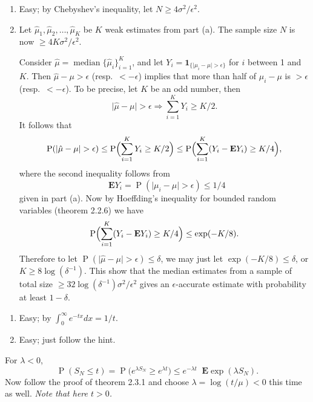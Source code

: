 \documentclass[11pt]{article}
\newcommand{\abs}[1]{\lvert #1 \rvert}
\renewcommand{\implies}{\Rightarrow}
\renewcommand{\Pr}{\operatorname{P}}
\newcommand{\E}{\mathop{}\!\mathbf{E}}
\newcommand{\I}[1]{\mathbf{1}_{\{#1\}}}
\theoremstyle{plain}
\theoremstyle{definition}
\theoremstyle{remark}
\theoremstyle{definition}
\newenvironment{mansol}[1]{%
  \renewcommand\themansolinner{#1}%
  \mansolinner
}{\endmansolinner}
\begin{document}
\begin{mansol}{2.2.9}
\begin{enumerate}[label=(\alph*)]
    \item Easy; by Chebyshev's inequality, let $N \geq 4 \sigma^2 / \epsilon^2$.
    \item Let $\hat{\mu}_1,\hat{\mu}_2,\ldots,\hat{\mu}_K$ be $K$ weak estimates from part (a). The sample size $N$ is now $\geq 4K \sigma^2/\epsilon^2$.

    Consider $\hat \mu = \operatorname{median}\{\hat \mu_i\}_{i=1}^K$, and let $Y_i = \I{\abs{\mu_i - \mu} > \epsilon}$ for $i$ between 1 and $K$. Then $\hat \mu - \mu > \epsilon$ (resp.\ $< -\epsilon$) implies that more than half of $\mu_i - \mu$ is $> \epsilon$ (resp.\ $< -\epsilon$). To be precise, let $K$ be an odd number, then \[\abs{\hat\mu - \mu} > \epsilon \implies \sum_{i=1}^K Y_i \geq K/2.\] It follows that \[
        \Pr(\abs{\hat \mu - \mu} > \epsilon) \leq \Pr\Bigl(\sum_{i=1}^K Y_i \geq K/2\Bigr) \leq \Pr\Bigl(\sum_{i=1}^K (Y_i - \E Y_i) \geq K/4\Bigr),
    \]
    where the second inequality follows from \[\E Y_i = \Pr(\abs{\mu_i - \mu} > \epsilon) \leq 1/4\] given in part (a). Now by Hoeffding's inequality for bounded random variables (theorem 2.2.6) we have \[
    \Pr\Bigl(\sum_{i=1}^K (Y_i - \E Y_i) \geq K/4\Bigr) \leq \exp(- K / 8).
    \]
    Therefore to let $\Pr(\abs{\hat \mu - \mu} > \epsilon) \leq \delta$, we may just let $\exp(- K / 8) \leq \delta$, or $K \geq 8 \log(\delta^{-1})$. This show that the median estimates from a sample of total size $\geq 32 \log(\delta^{-1}) \sigma^2/\epsilon^2$ gives an $\epsilon$-accurate estimate with probability at least $1-\delta$.
\end{enumerate}
\end{mansol}

\begin{mansol}{2.2.10}
\begin{enumerate}[label=(\alph*)]
\item Easy; by $\int_0^\infty e^{-tx} dx = 1/t$.
\item Easy; just follow the hint.
\end{enumerate}
\end{mansol}

\begin{mansol}{2.3.2}
For $\lambda < 0$, \[\Pr(S_N \leq t) = \Pr\bigl(e^{\lambda S_N} \geq e^{\lambda t}\bigr) \leq e^{-\lambda t} \E \exp(\lambda S_N).\]
Now follow the proof of theorem 2.3.1 and choose $\lambda = \log(t/\mu) < 0$ this time as well. \textit{Note that here $t > 0$.}
\end{mansol}
\end{document}
